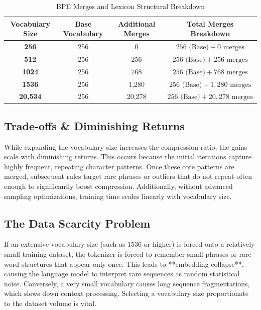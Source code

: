 \documentclass{article}
\begin{document}
\begin{table}[h!]
\centering
\caption{BPE Merges and Lexicon Structural Breakdown}
\label{tab:merges_comparison}
\begin{tabular}{cccc}
\toprule
\textbf{Vocabulary Size} & \textbf{Base Vocabulary} & \textbf{Additional Merges} & \textbf{Total Merges Breakdown} \\
\midrule
\textbf{256} & 256 & 0 & $256 \text{ (Base)} + 0 \text{ merges}$ \\
\textbf{512} & 256 & 256 & $256 \text{ (Base)} + 256 \text{ merges}$ \\
\textbf{1024} & 256 & 768 & $256 \text{ (Base)} + 768 \text{ merges}$ \\
\textbf{1536} & 256 & 1,280 & $256 \text{ (Base)} + 1,280 \text{ merges}$ \\
\textbf{20,534} & 256 & 20,278 & $256 \text{ (Base)} + 20,278 \text{ merges}$ \\
\bottomrule
\bottomrule
\end{tabular}
\end{table}

\subsection{Trade-offs \& Diminishing Returns}
While expanding the vocabulary size increases the compression ratio, the gains scale with diminishing returns. This occurs because the initial iterations capture highly frequent, repeating character patterns. Once these core patterns are merged, subsequent rules target rare phrases or outliers that do not repeat often enough to significantly boost compression. Additionally, without advanced sampling optimizations, training time scales linearly with vocabulary size.

\subsection{The Data Scarcity Problem}
If an extensive vocabulary size (such as $1536$ or higher) is forced onto a relatively small training dataset, the tokenizer is forced to remember small phrases or rare word structures that appear only once. This leads to **embedding collapse**, causing the language model to interpret rare sequences as random statistical noise. Conversely, a very small vocabulary causes long sequence fragmentations, which slows down context processing. Selecting a vocabulary size proportionate to the dataset volume is vital.
\end{document}
